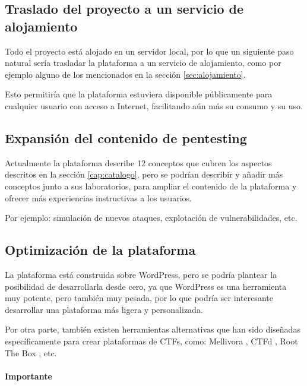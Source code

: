         \subsection{Traslado del proyecto a un servicio de alojamiento}

            Todo el proyecto está alojado en un servidor local, por lo que un siguiente paso natural sería trasladar la plataforma a un servicio de alojamiento, como por ejemplo alguno de los mencionados en la sección \ref{sec:alojamiento}.

            Esto permitiría que la plataforma estuviera disponible públicamente para cualquier usuario con acceso a Internet, facilitando aún más su consumo y su uso.

        \subsection{Expansión del contenido de pentesting}

            Actualmente la plataforma describe 12 conceptos que cubren los aspectos descritos en la sección \ref{cap:catalogo}, pero se podrían describir y añadir más conceptos junto a sus laboratorios, para ampliar el contenido de la plataforma y ofrecer más experiencias instructivas a los usuarios.

            Por ejemplo: simulación de nuevos ataques, explotación de vulnerabilidades, etc.
        
        \subsection{Optimización de la plataforma}

            La plataforma está construida sobre WordPress, pero se podría plantear la posibilidad de desarrollarla desde cero, ya que WordPress es una herramienta muy potente, pero también muy pesada, por lo que podría ser interesante desarrollar una plataforma más ligera y personalizada.

            Por otra parte, también existen herramientas alternativas que han sido diseñadas específicamente para crear plataformas de CTFs, como: Mellivora \cite{mellivora}, CTFd \cite{ctfd}, Root The Box \cite{root-the-box}, etc.

            \paragraph{Importante}
            
